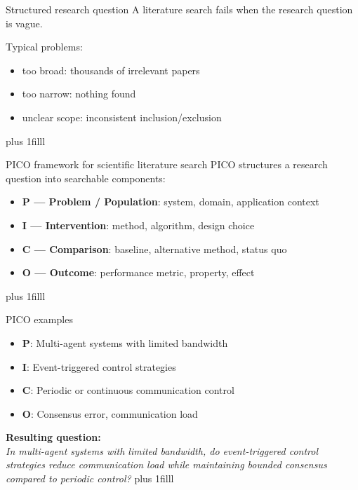 \documentclass[aspectratio=169]{beamer}
\newcommand{\btVFill}{\vskip0pt plus 1filll}
\begin{document}
\begin{frame}{Structured research question}
  A literature search fails when the research question is vague.

  \bigskip
  Typical problems:
  \begin{itemize}
    \item too broad: thousands of irrelevant papers
    \item too narrow: nothing found
    \item unclear scope: inconsistent inclusion/exclusion
  \end{itemize}

  \bigskip
\btVFill\end{frame}

\begin{frame}{PICO framework for scientific literature search}
  PICO structures a research question into searchable components:

  \bigskip
  \begin{itemize}
    \item \textbf{P — Problem / Population}: system, domain, application context
    \item \textbf{I — Intervention}: method, algorithm, design choice
    \item \textbf{C — Comparison}: baseline, alternative method, status quo
    \item \textbf{O — Outcome}: performance metric, property, effect
  \end{itemize}
\btVFill\end{frame}

\begin{frame}{PICO examples}
  \small
  \begin{itemize}
    \item \textbf{P}: Multi-agent systems with limited bandwidth
    \item \textbf{I}: Event-triggered control strategies
    \item \textbf{C}: Periodic or continuous communication control
    \item \textbf{O}: Consensus error, communication load
  \end{itemize}

  \bigskip
  \textbf{Resulting question:}\\
  \emph{In multi-agent systems with limited bandwidth, do event-triggered control
  strategies reduce communication load while maintaining bounded consensus compared
  to periodic control?}
  \btVFill
\end{frame}
\end{document}
